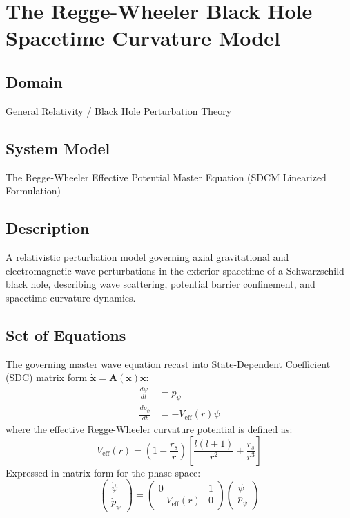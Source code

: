 \chapter{The Regge-Wheeler Black Hole Spacetime Curvature Model}

\section{Domain}
General Relativity / Black Hole Perturbation Theory

\section{System Model}
The Regge-Wheeler Effective Potential Master Equation (SDCM Linearized Formulation)

\section{Description}
A relativistic perturbation model governing axial gravitational and electromagnetic wave perturbations in the exterior spacetime of a Schwarzschild black hole, describing wave scattering, potential barrier confinement, and spacetime curvature dynamics.

\section{Set of Equations}
The governing master wave equation recast into State-Dependent Coefficient (SDC) matrix form $\dot{\mathbf{x}} = \mathbf{A}(\mathbf{x})\mathbf{x}$:
\begin{align}
\frac{d\psi}{dt} &= p_\psi \\
\frac{dp_\psi}{dt} &= -V_{\text{eff}}(r) \psi
\end{align}
where the effective Regge-Wheeler curvature potential is defined as:
\begin{equation}
V_{\text{eff}}(r) = \left(1 - \frac{r_s}{r}\right) \left[ \frac{l(l+1)}{r^2} + \frac{r_s}{r^3} \right]
\end{equation}
Expressed in matrix form for the phase space:
\begin{equation}
\begin{pmatrix} \dot{\psi} \\ \dot{p}_\psi \end{pmatrix} = \begin{pmatrix} 0 & 1 \\ -V_{\text{eff}}(r) & 0 \end{pmatrix} \begin{pmatrix} \psi \\ p_\psi \end{pmatrix}
\end{equation}

